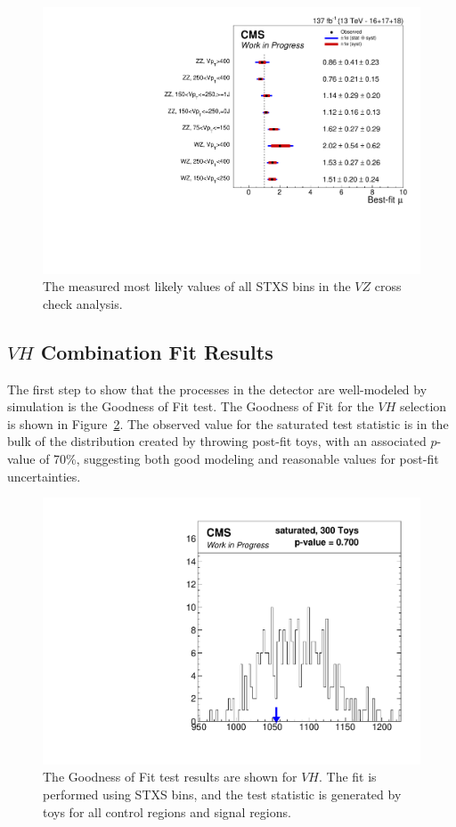 \begin{figure}
  \centering
  \includegraphics[width=0.8\linewidth]{figures/210308_STXS_VZ_unblinded_XbbVZ_e4179c95_a866aef8/summary_stxs.pdf}
  \caption[Measured STXS values of $V\!Z$]{
    The measured most likely values of all STXS bins in the
    $V\!Z$ cross check analysis.
  }
  \label{fig:vz-stxs}
\end{figure}

\subsection{$V\!H$ Combination Fit Results}

The first step to show that the processes in the detector are well-modeled
by simulation is the Goodness of Fit test.
The Goodness of Fit for the $V\!H$ selection is shown in Figure~\ref{fig:vh-gof}.
The observed value for the saturated test statistic is in the bulk of the distribution created by throwing
post-fit toys, with an associated $p$-value of 70\%, suggesting both good modeling and
reasonable values for post-fit uncertainties.
%
\begin{figure}
  \centering
  \includegraphics[width=0.65\linewidth]{figures/210308_STXSfine_400split_Xbb_8f854f5a_inclusive_gof/Gof_inclusive_.pdf}
  \caption[Goodness of Fit for $V\!H$]{
    The Goodness of Fit test results are shown for $V\!H$.
    The fit is performed using STXS bins,
    and the test statistic is generated by toys for all control regions and signal regions.
  }
  \label{fig:vh-gof}
\end{figure}

